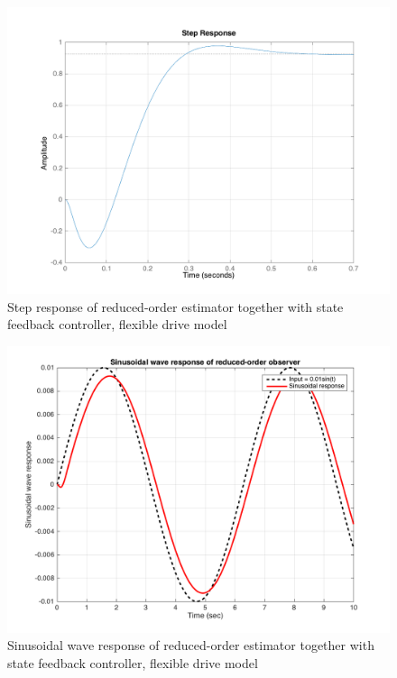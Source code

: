 \documentclass[a4paper, 12pt]{article}
\begin{document}
\begin{figure}[!htbp]
\centering
\includegraphics[scale = 0.3]{FlexibleStepResponseReduOrderEst}
\caption{Step response of reduced-order estimator together with state feedback controller, flexible drive model}
\label{FlexibleStepResponseReduOrderEst}
\end{figure}

\begin{figure}[!htbp]
\centering
\includegraphics[scale = 0.3]{FlexibleSinusoidalResponseReduOrderEst}
\caption{Sinusoidal wave response of reduced-order estimator together with state feedback controller, flexible drive model}
\label{FlexibleSinusoidalResponseReduOrderEst}
\end{figure}
\end{document}

